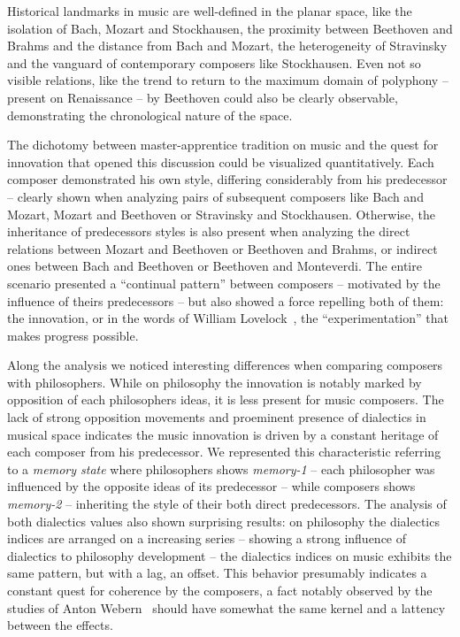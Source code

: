 \documentclass[
 aip,
 jmp,
 amsmath,amssymb,
 reprint,
]{revtex4-1}
\begin{document}
Historical landmarks in music are
well-defined in the planar space, like the isolation of Bach, Mozart
and Stockhausen, the
proximity between Beethoven and Brahms and the distance from Bach and Mozart, the heterogeneity of
Stravinsky and the vanguard of contemporary composers
like Stockhausen. Even not so visible relations, like the trend to return to the
maximum domain of polyphony -- present on Renaissance -- by Beethoven
could also be clearly observable, demonstrating the chronological nature of the
space. 

The dichotomy between
master-apprentice tradition on music and the quest for innovation that
opened this discussion could be visualized quantitatively. Each
composer demonstrated his own style, differing considerably from his
predecessor -- clearly shown when analyzing pairs of subsequent composers like
Bach and Mozart, Mozart and Beethoven or Stravinsky and
Stockhausen. Otherwise, the inheritance of predecessors styles is also
present when analyzing the direct relations between Mozart and
Beethoven or Beethoven and
Brahms, or indirect ones between Bach and Beethoven
or Beethoven and Monteverdi. The entire scenario presented
a ``continual pattern'' between
composers -- motivated by the influence of theirs predecessors -- but also showed a force
repelling both of them: the innovation, or in the words of William
Lovelock~\cite{Lovelock}, the ``experimentation'' that makes progress possible.

Along the analysis we noticed interesting differences when comparing
composers with philosophers. While on philosophy the
innovation is notably marked by opposition of each philosophers ideas,
it is less present for music composers. The lack of strong %
opposition movements and proeminent presence of dialectics in musical space indicates the music innovation is driven by
a constant heritage of each composer from his predecessor. We
represented this characteristic referring to a \textit{memory state}
where philosophers shows \textit{memory-1} -- each philosopher was
influenced by the opposite ideas of its predecessor -- while
composers shows \textit{memory-2} -- inheriting the style of their
both direct predecessors.
The
analysis of both dialectics values also shown surprising
results: on philosophy the dialectics indices are arranged on a
increasing series -- showing a strong influence of
dialectics to philosophy development -- the dialectics indices on
music exhibits the same pattern, but with a lag, an offset. This behavior presumably indicates a
constant quest for coherence by the composers, a fact notably observed by
the studies of Anton Webern~\cite{Webern} should have somewhat the same
kernel and a lattency between the effects.
\end{document}
